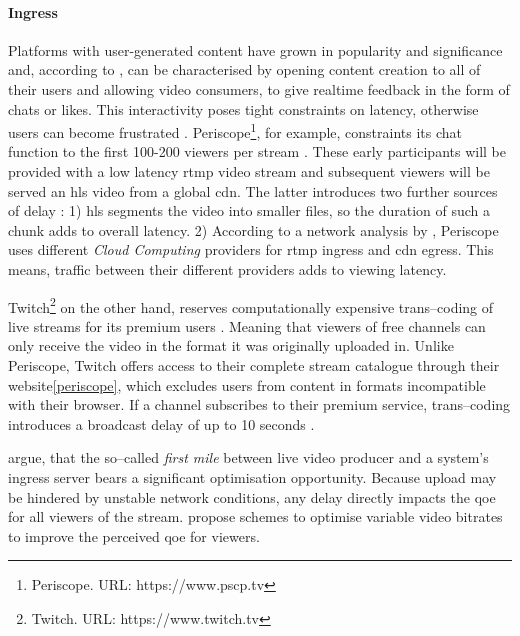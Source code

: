 \paragraph{Ingress}
Platforms with user-generated content have grown in popularity and significance and, according to \citet{twitch-case}, can be characterised by opening content creation to all of their users and allowing video consumers, to give realtime feedback in the form of chats or likes. This interactivity poses tight constraints on latency, otherwise users can become frustrated \cite[\S5]{periscope-experience}. Periscope\footnote{\label{periscope}Periscope. URL:  {https://www.pscp.tv}}, for example, constraints its chat function to the first 100-200 viewers per stream \cite{anatomy-personalized-livestreaming}. These early participants will be provided with a low latency \gls{rtmp} video stream and subsequent viewers will be served an \gls{hls} video from a global \gls{cdn}. The latter introduces two further sources of delay \cite[\S2-3]{periscope-experience}: 1) \gls{hls} segments the video into smaller files, so the duration of such a chunk adds to overall latency. 2) According to a network analysis by \citet{periscope-experience}, Periscope uses different \textit{Cloud Computing} providers for \gls{rtmp} ingress and \gls{cdn} egress. This means, traffic between their different providers adds to viewing latency.

Twitch\footnote{\label{twitch}Twitch. URL: {https://www.twitch.tv}} on the other hand, reserves computationally expensive trans–coding of live streams for its premium users \cite[\S2]{twitch-measurement-study}. Meaning that viewers of free channels can only receive the video in the format it was originally uploaded in. Unlike Periscope, Twitch offers access to their complete stream catalogue through their website\vref{periscope}, which excludes users from content in formats incompatible with their browser. If a channel subscribes to their premium service, trans–coding introduces a broadcast delay of up to 10 seconds \cite[\S4.2]{twitch-measurement-study}.

\citet[\S{III.A}]{content-harvest-network} argue, that the so–called \textit{first mile} between live video producer and a system's ingress server bears a significant optimisation opportunity. Because upload may be hindered by unstable network conditions, any delay directly impacts the \gls{qoe} for all viewers of the stream. \citet*{personalized-live-streaming-experience} propose schemes to optimise variable video bitrates to improve the perceived \gls{qoe} for viewers.

